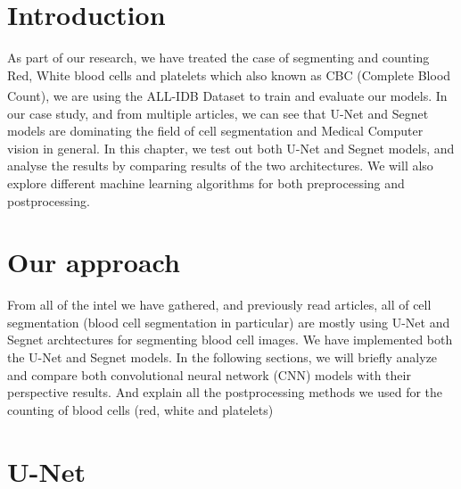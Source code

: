 \section{Introduction}
\vspace{0.2in}
\hspace*{0.16in}
As part of our research, we have treated the case of segmenting and counting Red, White blood cells and platelets which also known as CBC (Complete Blood Count), we are using the ALL-IDB\textsuperscript{\cite{pm77-2n23-20}} Dataset to train and evaluate our models.
In our case study, and from multiple articles, we can see that U-Net and Segnet models are dominating the field of cell segmentation and Medical Computer vision in general.
In this chapter, we test out both U-Net and Segnet models, and analyse the results by comparing results of the two architectures.
We will also explore different machine learning algorithms for both preprocessing and postprocessing.

\section{Our approach}
\vspace{0.2in}
\hspace*{0.16in}
From all of the intel we have gathered, and previously read articles, all of cell segmentation (blood cell segmentation in particular) are mostly using U-Net and Segnet archtectures for segmenting blood cell images.
We have implemented both the U-Net and Segnet models.
In the following sections, we will briefly analyze and compare both convolutional neural network (CNN) models with their perspective results.
And explain all the postprocessing methods we used for the counting of blood cells (red, white and platelets)

\section{U-Net}
